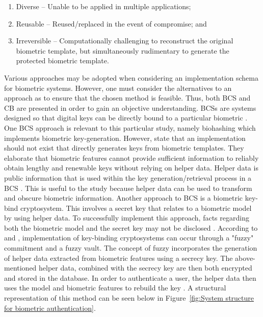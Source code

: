 \begin{enumerate}[label=\roman*.]
	\item Diverse – Unable to be applied in multiple applications;
	\item Reusable – Reused/replaced in the event of compromise; and
	\item Irreversible – Computationally challenging to reconstruct the original biometric template, but simultaneously rudimentary to generate the protected biometric template.
\end{enumerate}

Various approaches may be adopted when considering an implementation schema for biometric systems. However, one must consider the alternatives to an approach as to ensure that the chosen method is feasible. Thus, both BCS and CB are presented in order to gain an objective understanding. 
BCSs are systems designed so that digital keys can be directly bound to a particular biometric \citep{Rathgeb2011}. One BCS approach is relevant to this particular study, namely biohashing which implements biometric key-generation. However, \cite{Rathgeb2011} state that an implementation should not exist that directly generates keys from biometric templates. They elaborate that biometric features cannot provide sufficient information to reliably obtain lengthy and renewable keys without relying on helper data. Helper data is public information that is used within the key generation/retrieval process in a BCS \citep{Rathgeb2011}.  This is useful to the study because helper data can be used to transform and obscure biometric information. Another approach to BCS is a biometric key-bind cryptosystem. This involves a secret key that relates to a biometric model by using helper data. To successfully implement this approach, facts regarding both the biometric model and the secret key may not be disclosed \citep{Eng2016}. According to \cite{Paul2014} and \cite{Rathgeb2011}, implementation of key-binding cryptosystems can occur through a "fuzzy" commitment and a fuzzy vault. The concept of fuzzy incorporates the generation of helper data extracted from biometric features using a secrecy key. The above-mentioned helper data, combined with the secrecy key are then both encrypted and stored in the database. In order to authenticate a user, the helper data then uses the model and biometric features to rebuild the key \citep{Eng2016}. A structural representation of this method can be seen below in Figure~\ref{fig:System structure for biometric authentication}.

